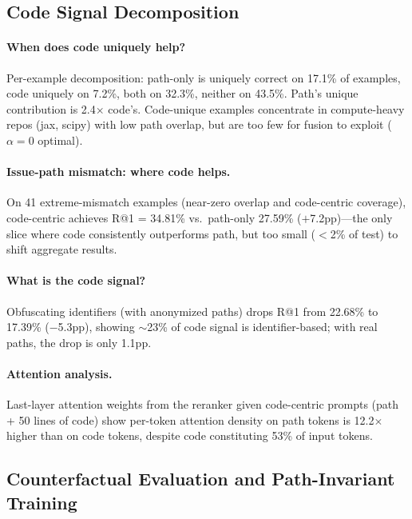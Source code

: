 \documentclass{article}
\begin{document}
\subsection{Code Signal Decomposition}
\label{app:code_decomposition}

\paragraph{When does code uniquely help?}
Per-example decomposition: path-only is uniquely correct on 17.1\% of examples, code uniquely on 7.2\%, both on 32.3\%, neither on 43.5\%.
Path's unique contribution is 2.4$\times$ code's. Code-unique examples concentrate in compute-heavy repos (jax, scipy) with low path overlap, but are too few for fusion to exploit ($\alpha{=}0$ optimal).

\paragraph{Issue-path mismatch: where code helps.}
On 41 extreme-mismatch examples (near-zero overlap and code-centric coverage), code-centric achieves R@1 = 34.81\% vs.\ path-only 27.59\% ($+$7.2pp)---the only slice where code consistently outperforms path, but too small ($<$2\% of test) to shift aggregate results.

\paragraph{What is the code signal?}
Obfuscating identifiers (with anonymized paths) drops R@1 from 22.68\% to 17.39\% ($-$5.3pp), showing $\sim$23\% of code signal is identifier-based; with real paths, the drop is only 1.1pp.

\paragraph{Attention analysis.}
Last-layer attention weights from the reranker given code-centric prompts (path + 50 lines of code) show per-token attention density on path tokens is 12.2$\times$ higher than on code tokens, despite code constituting 53\% of input tokens.

\subsection{Counterfactual Evaluation and Path-Invariant Training}
\label{app:counterfactual}
\end{document}
